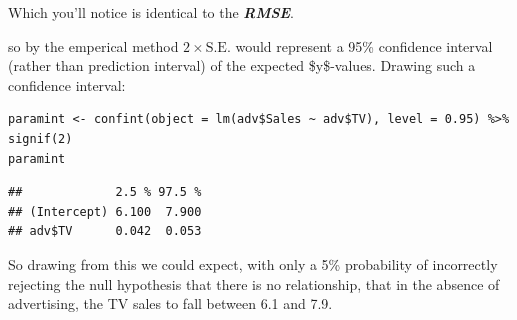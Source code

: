 \documentclass[11pt]{article}
\begin{document}
Which you'll notice is identical to the \textbf{\emph{RMSE}}.

so by the emperical method \(2\times \text{S.E.}\) would represent a 95\%
confidence interval (rather than prediction interval) of the expected
\$y\$-values. Drawing such a confidence interval:

\begin{verbatim}
paramint <- confint(object = lm(adv$Sales ~ adv$TV), level = 0.95) %>% signif(2)
paramint
\end{verbatim}

\begin{verbatim}
##             2.5 % 97.5 %
## (Intercept) 6.100  7.900
## adv$TV      0.042  0.053
\end{verbatim}

So drawing from this we could expect, with only a 5\% probability of
incorrectly rejecting the null hypothesis that there is no relationship,
that in the absence of advertising, the TV sales to fall between 6.1 and
7.9.
\end{document}
